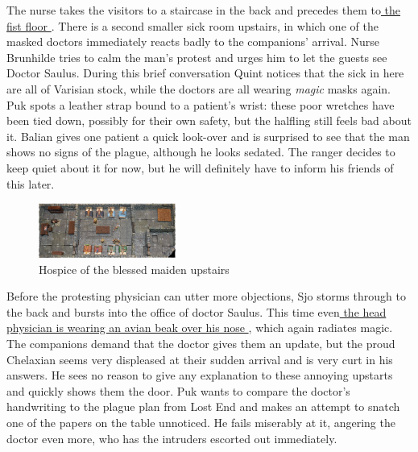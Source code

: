 The nurse takes the visitors to a staircase in the back and precedes them to\hyperref[fig:Hospice-of-the-blessed-maiden-upstairs-515717557]{ the fist floor } . There is a second smaller sick room upstairs, in which one of the masked doctors immediately reacts badly to the companions' arrival. Nurse Brunhilde tries to calm the man's protest and urges him to let the guests see Doctor Saulus. During this brief conversation Quint notices that the sick in here are all of Varisian stock, while the doctors are all wearing  {\itshape magic} masks again. Puk spots a leather strap bound to a patient's wrist: these poor wretches have been tied down, possibly for their own safety, but the halfling still feels bad about it. Balian gives one patient a quick look-over and is surprised to see that the man shows no signs of the plague, although he looks sedated. The ranger decides to keep quiet about it for now, but he will definitely have to inform his friends of this later. \\

\begin{figure}[h]
	\centering
	\includegraphics[width=0.4\textwidth]{images/Hospice-of-the-blessed-maiden-upstairs-515717557_mod.jpg}
	\caption{Hospice of the blessed maiden upstairs}
	\label{fig:Hospice-of-the-blessed-maiden-upstairs-515717557}
\end{figure}

Before the protesting physician can utter more objections, Sjo storms through to the back and bursts into the office of doctor Saulus. This time even\hyperref[fig:Hospice-of-the-blessed-maiden-doctor-515717926]{ the head physician is wearing an avian beak over his nose } , which again radiates magic. The companions demand that the doctor gives them an update, but the proud Chelaxian seems very displeased at their sudden arrival and is very curt in his answers. He sees no reason to give any explanation to these annoying upstarts and quickly shows them the door. Puk wants to compare the doctor's handwriting to the plague plan from Lost End and makes an attempt to snatch one of the papers on the table unnoticed. He fails miserably at it, angering the doctor even more, who has the intruders escorted out immediately. \\

